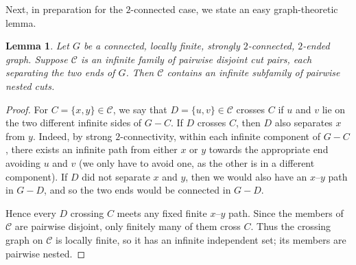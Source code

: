 \documentclass{article}
\theoremstyle{plain}
\newtheorem{lem}[thm]{Lemma}
\theoremstyle{definition}
\begin{document}
Next, in preparation for the $2$-connected case, we state an easy graph-theoretic lemma.

\begin{lem}\label{lem:nested-cut-pairs}
Let $G$ be a connected, locally finite, strongly $2$-connected, $2$-ended graph. Suppose $\mathcal C$ is an infinite family of pairwise disjoint cut pairs, each separating the two ends of $G$. Then $\mathcal C$ contains an infinite subfamily of pairwise nested cuts.
\end{lem}

\begin{proof}
For $C=\{x,y\}\in\mathcal C$, we say that $D=\{u,v\}\in\mathcal C$ crosses $C$ if $u$ and $v$ lie on the two different infinite sides of $G-C$. If $D$ crosses $C$, then $D$ also separates $x$ from $y$. Indeed, by strong $2$-connectivity, within each infinite component of $G-C$, there exists an infinite path from either $x$ or $y$ towards the appropriate end avoiding $u$ and $v$ (we only have to avoid one, as the other is in a different component). If $D$ did not separate $x$ and $y$, then we would also have an $x$--$y$ path in $G-D$, and so the two ends would be connected in $G-D$. 

Hence every $D$ crossing $C$ meets any fixed finite $x$--$y$ path. Since the members of $\mathcal C$ are pairwise disjoint, only finitely many of them cross $C$. Thus the crossing graph on $\mathcal C$ is locally finite, so it has an infinite independent set; its members are pairwise nested.
\end{proof}
\end{document}
